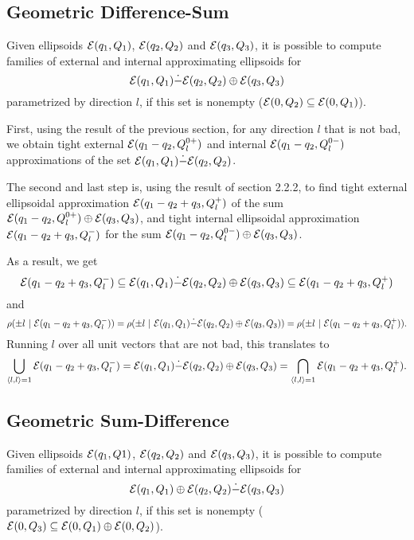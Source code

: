 \subsection{Geometric Difference-Sum}\label{subsec_diffsum}
Given ellipsoids $\EE(q_1,Q_1)$, $\EE(q_2,Q_2)$ and $\EE(q_3,Q_3)$, it is
possible to compute families of external and internal approximating
ellipsoids for 
\begin{equation}
\EE(q_1,Q_1) \dot{-} \EE(q_2,Q_2) \oplus \EE(q_3,Q_3) \label{minkmp}
\end{equation}
parametrized by direction $l$, if this set is nonempty
($\EE(0,Q_2)\subseteq\EE(0,Q_1)$).

First, using the result of the previous section, for any direction $l$ that
is not bad, we obtain tight external $\EE(q_1-q_2, Q_l^{0+})$ and internal
$\EE(q_1-q_2, Q_l^{0-})$ approximations of the set
$\EE(q_1,Q_1)\dot{-}\EE(q_2,Q_2)$.

The second and last step is, using the result of section 2.2.2, to find
tight external ellipsoidal approximation $\EE(q_1-q_2+q_3,Q_l^+)$ of the sum
$\EE(q_1-q_2,Q_l^{0+})\oplus\EE(q_3,Q_3)$, and tight internal ellipsoidal
approximation $\EE(q_1-q_2+q_3,Q_l^-)$ for the sum
$\EE(q_1-q_2,Q_l^{0-})\oplus\EE(q_3,Q_3)$.

As a result, we get
\[ \EE(q_1-q_2+q_3,Q_l^-) \subseteq
\EE(q_1,Q_1)\dot{-}\EE(q_2,Q_2)\oplus\EE(q_3,Q_3) \subseteq
\EE(q_1-q_2+q_3,Q_l^+) \]
and
\[ \rho(\pm l ~|~\EE(q_1-q_2+q_3,Q_l^-)) =
\rho(\pm l ~|~ \EE(q_1,Q_1)\dot{-}\EE(q_2,Q_2)\oplus\EE(q_3,Q_3)) =
\rho(\pm l ~|~ \EE(q_1-q_2+q_3,Q_l^+)). \]
Running $l$ over all unit vectors that are not bad, this translates to
\[ \bigcup_{\langle l,l\rangle=1} \EE(q_1-q_2+q_3,Q_l^-) =
\EE(q_1,Q_1)\dot{-}\EE(q_2,Q_2)\oplus\EE(q_3,Q_3) =
\bigcap_{\langle l,l\rangle=1} \EE(q_1-q_2+q_3,Q_l^+) .\]












\subsection{Geometric Sum-Difference}\label{subsec_sumdiff}
Given ellipsoids $\EE(q_1,Q1)$, $\EE(q_2,Q_2)$ and $\EE(q_3,Q_3)$, it is
possible to compute families of external and internal approximating
ellipsoids for 
\begin{equation}
\EE(q_1,Q_1) \oplus \EE(q_2,Q_2) \dot{-} \EE(q_3,Q_3) \label{minkpm}
\end{equation}
parametrized by direction $l$, if this set is nonempty
($\EE(0,Q_3)\subseteq\EE(0,Q_1)\oplus\EE(0,Q_2)$).

